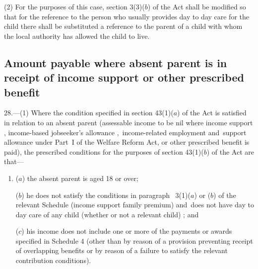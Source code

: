 \documentclass[12pt,a4paper]{article}
\begin{document}
(2) For the purposes of this case, section 3(3)($b$) of the Act shall be modified so that for the reference to the person who usually provides day to day care for the child there shall be substituted a reference to the parent of a child 
with  %
whom the local authority 
has allowed the child to live.  %


\subsection[28. Amount payable where absent parent is in receipt of income support or other prescribed benefit]{Amount payable where absent parent is in receipt of income support or other prescribed benefit}

28.—(1) Where the condition specified in section 43(1)($a$) of the Act is satisfied in relation to an absent parent (assessable income to be nil where income support%
, income-based jobseeker’s allowance%
,~income-related employment and~support allowance under Part~I of the Welfare Reform Act,  %
or other prescribed benefit is paid), the prescribed conditions for the purposes of section 43(1)($b$) of the Act are that—
\begin{enumerate}\item[]
($a$) the absent parent is aged 18 or over;

($b$) he does not satisfy the conditions in paragraph~
3(1)($a$) or ($b$)  %
of the relevant Schedule (income support family premium)
and~does not have day to day care of any child (whether or not a relevant child)%
; and

($c$) 
his income does not include %
one or more of the payments or awards specified in Schedule 4 (other than by reason of a provision preventing receipt of overlapping benefits or by reason of a failure to satisfy the relevant contribution conditions).
\end{enumerate}
\end{document}
